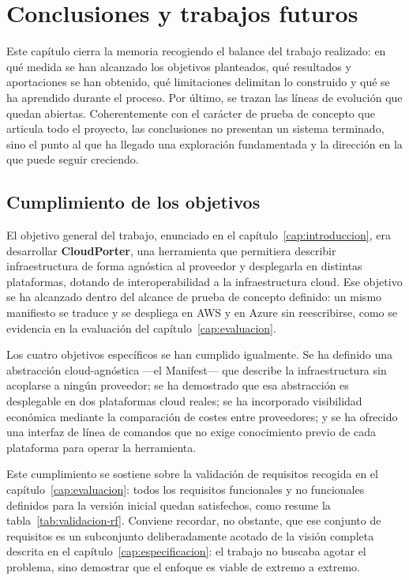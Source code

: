 \chapter{Conclusiones y trabajos futuros}\label{cap:conclusiones}

Este capítulo cierra la memoria recogiendo el balance del trabajo realizado: en qué medida se
han alcanzado los objetivos planteados, qué resultados y aportaciones se han obtenido, qué
limitaciones delimitan lo construido y qué se ha aprendido durante el proceso. Por último, se
trazan las líneas de evolución que quedan abiertas. Coherentemente con el carácter de prueba
de concepto que articula todo el proyecto, las conclusiones no presentan un sistema terminado,
sino el punto al que ha llegado una exploración fundamentada y la dirección en la que puede
seguir creciendo.

\section{Cumplimiento de los objetivos}

El objetivo general del trabajo, enunciado en el capítulo~\ref{cap:introduccion}, era desarrollar
\textbf{CloudPorter}, una herramienta que permitiera describir infraestructura de forma agnóstica
al proveedor y desplegarla en distintas plataformas, dotando de interoperabilidad a la
infraestructura cloud. Ese objetivo se ha alcanzado dentro del alcance de prueba de concepto
definido: un mismo manifiesto se traduce y se despliega en AWS y en Azure sin reescribirse, como
se evidencia en la evaluación del capítulo~\ref{cap:evaluacion}.

Los cuatro objetivos específicos se han cumplido igualmente. Se ha definido una abstracción
cloud-agnóstica —el Manifest— que describe la infraestructura sin acoplarse a ningún proveedor; se
ha demostrado que esa abstracción es desplegable en dos plataformas cloud reales; se ha incorporado
visibilidad económica mediante la comparación de costes entre proveedores; y se ha ofrecido una
interfaz de línea de comandos que no exige conocimiento previo de cada plataforma para operar la
herramienta.

Este cumplimiento se sostiene sobre la validación de requisitos recogida en el
capítulo~\ref{cap:evaluacion}: todos los requisitos funcionales y no funcionales definidos para la
versión inicial quedan satisfechos, como resume la tabla~\ref{tab:validacion-rf}. Conviene recordar,
no obstante, que ese conjunto de requisitos es un subconjunto deliberadamente acotado de la visión
completa descrita en el capítulo~\ref{cap:especificacion}: el trabajo no buscaba agotar el problema,
sino demostrar que el enfoque es viable de extremo a extremo.

